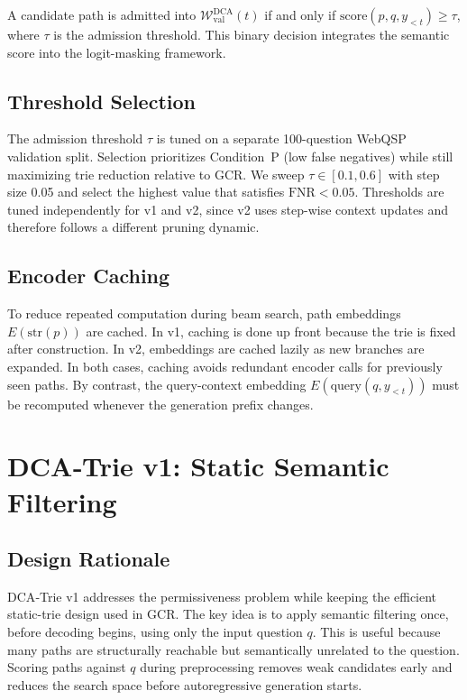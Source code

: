 A candidate path is admitted into $\mathcal{W}_{\text{val}}^{\text{DCA}}(t)$ if and only if $\text{score}(p, q, y_{<t}) \geq \tau$, where $\tau$ is the admission threshold. This binary decision integrates the semantic score into the logit-masking framework.

\subsection{Threshold Selection}

The admission threshold $\tau$ is tuned on a separate 100-question WebQSP validation split. Selection prioritizes Condition~P (low false negatives) while still maximizing trie reduction relative to GCR. We sweep $\tau \in [0.1, 0.6]$ with step size 0.05 and select the highest value that satisfies $\text{FNR} < 0.05$. Thresholds are tuned independently for v1 and v2, since v2 uses step-wise context updates and therefore follows a different pruning dynamic.

\subsection{Encoder Caching}

To reduce repeated computation during beam search, path embeddings $E(\text{str}(p))$ are cached. In v1, caching is done up front because the trie is fixed after construction. In v2, embeddings are cached lazily as new branches are expanded. In both cases, caching avoids redundant encoder calls for previously seen paths. By contrast, the query-context embedding $E(\text{query}(q, y_{<t}))$ must be recomputed whenever the generation prefix changes.

\section{DCA‑Trie v1: Static Semantic Filtering}
\label{sec:ch3v1}

\subsection{Design Rationale}

DCA‑Trie v1 addresses the permissiveness problem while keeping the efficient static-trie design used in GCR. The key idea is to apply semantic filtering once, before decoding begins, using only the input question $q$. This is useful because many paths are structurally reachable but semantically unrelated to the question. Scoring paths against $q$ during preprocessing removes weak candidates early and reduces the search space before autoregressive generation starts.

